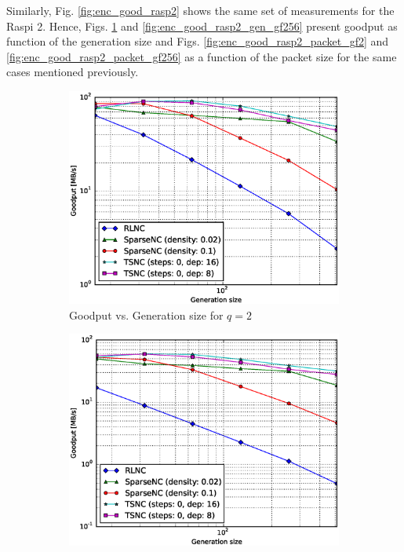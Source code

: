 Similarly, Fig. \ref{fig:enc_good_rasp2} shows the same set of
measurements for the \ac{Raspi} 2. Hence, Figs. \ref{fig:enc_good_rasp2_gen_gf2}
and \ref{fig:enc_good_rasp2_gen_gf256} present goodput as function of the
generation size  and Figs. \ref{fig:enc_good_rasp2_packet_gf2} and 
\ref{fig:enc_good_rasp2_packet_gf256} as a function of the packet size for the
same cases mentioned previously.

\begin{figure}
    \centering
    \begin{subfigure}[b]{0.475\textwidth}
        \centering
        \includegraphics[width=1.15\textwidth]{images/23_07_2015/goodput_vs_generation_size_Rasp_v2_encoder_Binary_1600.eps}
        \caption[]%
        {{\small Goodput vs. Generation size for $q = 2$}}    
        \label{fig:enc_good_rasp2_gen_gf2}
    \end{subfigure}
    \hfill
    \begin{subfigure}[b]{0.475\textwidth}  
        \centering 
        \includegraphics[width=1.15\textwidth]{images/23_07_2015/goodput_vs_generation_size_Rasp_v2_encoder_Binary8_1600.eps}

\end{subfigure}
\end{figure}
